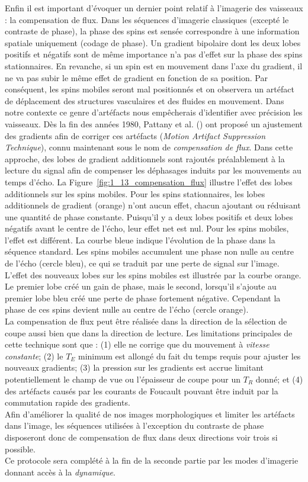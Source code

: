 Enfin il est important d'évoquer un dernier point relatif à l'imagerie des vaisseaux : la compensation de flux. Dans les séquences d'imagerie classiques (excepté le contraste de phase), la phase des spins est sensée correspondre à une information spatiale uniquement (codage de phase). Un gradient bipolaire dont les deux lobes positifs et négatifs sont de même importance n'a pas d'effet sur la phase des spins stationnaires. En revanche, si un spin est en mouvement dans l'axe du gradient, il ne va pas subir le même effet de gradient en fonction de sa position. Par conséquent, les spins mobiles seront mal positionnés et on observera un artéfact de déplacement des structures vasculaires et des fluides en mouvement. Dans notre contexte ce genre d'artéfacts nous empêcherais d'identifier avec précision les vaisseaux. Dès la fin des années 1980, Pattany et al. (\cite{Pattany1987}) ont proposé un ajustement des gradients afin de corriger ces artéfacts ({\em Motion Artifact Suppression Technique}), connu maintenant sous le nom de {\em compensation de flux}. Dans cette approche, des lobes de gradient additionnels sont rajoutés préalablement à la lecture du signal afin de compenser les déphasages induits par les mouvements au temps d'écho. La Figure~\ref{fig:1_13_compensation_flux} illustre l'effet des lobes additionnels sur les spins mobiles. Pour les spins stationnaires, les lobes additionnels de gradient (orange) n'ont aucun effet, chacun ajoutant ou réduisant une quantité de phase constante. Puisqu'il y a deux lobes positifs et deux lobes négatifs avant le centre de l'écho, leur effet net est nul. Pour les spins mobiles, l'effet est différent. La courbe bleue indique l'évolution de la phase dans la séquence standard. Les spins mobiles accumulent une phase non nulle au centre de l'écho (cercle bleu), ce qui se traduit par une perte de signal sur l'image. L'effet des nouveaux lobes sur les spins mobiles est illustrée par la courbe orange. Le premier lobe créé un gain de phase, mais le second, lorsqu'il s'ajoute au premier lobe bleu créé une perte de phase fortement négative. Cependant la phase de ces spins devient nulle au centre de l'écho (cercle orange).\\
La compensation de flux peut être réalisée dans la direction de la sélection de coupe aussi bien que dans la direction de lecture. Les limitations principales de cette technique sont que : (1) elle ne corrige que du mouvement à {\em vitesse constante}; (2) le $T_E$ minimum est allongé du fait du temps requis pour ajuster les nouveaux gradients; (3) la pression sur les gradients est accrue limitant potentiellement le champ de vue ou l'épaisseur de coupe pour un $T_R$ donné; et (4) des artéfacts causés par les courants de Foucault pouvant être induit par la commutation rapide des gradients.
\\
Afin d'améliorer la qualité de nos images morphologiques et limiter les artéfacts dans l'image, les séquences utilisées à l'exception du contraste de phase disposeront donc de compensation de flux dans deux directions voir trois si possible.\\

Ce protocole sera complété à la fin de la seconde partie par les modes d’imagerie donnant accès à la {\em dynamique}.





			
		
{}

